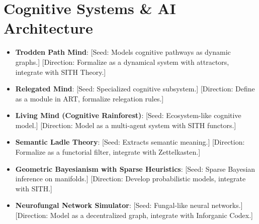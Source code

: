 \documentclass[11pt,oneside]{memoir}
\theoremstyle{plain}
\begin{document}
\section{Cognitive Systems \& AI Architecture}
\begin{itemize}
    \item \textbf{Trodden Path Mind}: [Seed: Models cognitive pathways as dynamic graphs.] [Direction: Formalize as a dynamical system with attractors, integrate with SITH Theory.]
    \item \textbf{Relegated Mind}: [Seed: Specialized cognitive subsystem.] [Direction: Define as a module in ART, formalize relegation rules.]
    \item \textbf{Living Mind (Cognitive Rainforest)}: [Seed: Ecosystem-like cognitive model.] [Direction: Model as a multi-agent system with SITH functors.]
    \item \textbf{Semantic Ladle Theory}: [Seed: Extracts semantic meaning.] [Direction: Formalize as a functorial filter, integrate with Zettelkasten.]
    \item \textbf{Geometric Bayesianism with Sparse Heuristics}: [Seed: Sparse Bayesian inference on manifolds.] [Direction: Develop probabilistic models, integrate with SITH.]
    \item \textbf{Neurofungal Network Simulator}: [Seed: Fungal-like neural networks.] [Direction: Model as a decentralized graph, integrate with Inforganic Codex.]
\end{itemize}

\backmatter


\end{document}

